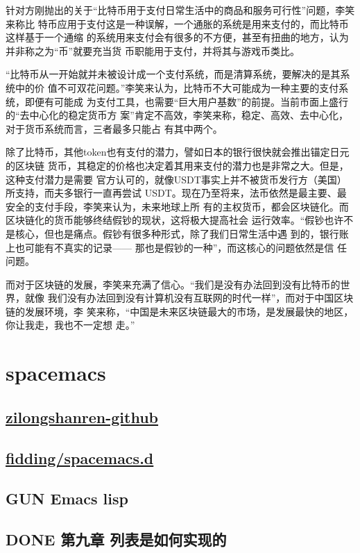 \documentclass[11pt]{ctexart}
\begin{document}
针对方刚抛出的关于“比特币用于支付日常生活中的商品和服务可行性”问题，李笑来称比
特币应用于支付这是一种误解，一个通胀的系统是用来支付的，而比特币这样基于一个通缩
的系统用来支付会有很多的不方便，甚至有扭曲的地方，认为并非称之为“币”就要充当货
币职能用于支付，并将其与游戏币类比。

“比特币从一开始就并未被设计成一个支付系统，而是清算系统，要解决的是其系统中的价
值不可双花问题。”李笑来认为，比特币不大可能成为一种主要的支付系统，即便有可能成
为支付工具，也需要“巨大用户基数”的前提。当前市面上盛行的“去中心化的稳定货币方
案”肯定不高效，李笑来称，稳定、高效、去中心化，对于货币系统而言，三者最多只能占
有其中两个。

除了比特币，其他token也有支付的潜力，譬如日本的银行很快就会推出锚定日元的区块链
货币，其稳定的价格也决定着其用来支付的潜力也是非常之大。但是，这种支付潜力是需要
官方认可的，就像USDT事实上并不被货币发行方（美国）所支持，而夫多银行一直再尝试
USDT。现在乃至将来，法币依然是最主要、最安全的支付手段，李笑来认为，未来地球上所
有的主权货币，都会区块链化。而区块链化的货币能够终结假钞的现状，这将极大提高社会
运行效率。“假钞也许不是核心，但也是痛点。假钞有很多种形式，除了我们日常生活中遇
到的，银行账上也可能有不真实的记录—— 那也是假钞的一种”，而这核心的问题依然是信
任问题。

而对于区块链的发展，李笑来充满了信心。“我们是没有办法回到没有比特币的世界，就像
我们没有办法回到没有计算机没有互联网的时代一样”，而对于中国区块链的发展环境，李
笑来称，“中国是未来区块链最大的市场，是发展最快的地区，你让我走，我也不一定想
走。”

\section{spacemacs}
\label{sec:org7022325}
\subsection{\href{https://github.com/zilongshanren}{zilongshanren-github}}
\label{sec:orgeffcadd}
\subsection{\href{https://github.com/fidding/spacemacs.d/blob/master/fidding/packages.el}{fidding/spacemacs.d}}
\label{sec:org4aefed8}
\subsection{GUN Emacs lisp}
\label{sec:org113aa54}
\subsection{{\bfseries\sffamily DONE} 第九章 列表是如何实现的}
\label{sec:org669df8f}
\end{document}
